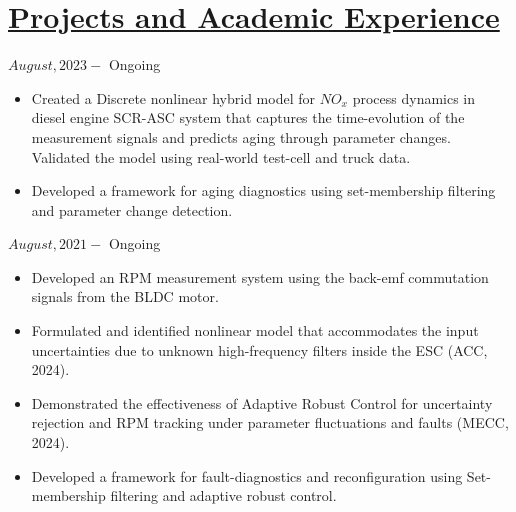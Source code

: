 \section*{\underline{Projects and Academic Experience}}
\noindent {} \hfill $August, 2023 - $ Ongoing
\begin{itemize}
        \item Created a Discrete nonlinear hybrid model for $NO_x$ process dynamics in diesel engine SCR-ASC system that captures the time-evolution of the measurement signals and predicts aging through parameter changes. Validated the model using real-world test-cell and truck data.
        \item Developed a framework for aging diagnostics using set-membership filtering and parameter change detection.
\end{itemize}

\medskip

\noindent {} \hfill $August, 2021 - $ Ongoing
\begin{itemize}
        \item Developed an RPM measurement system using the back-emf commutation signals from the BLDC motor.
        \item Formulated and identified nonlinear model that accommodates the input uncertainties due to unknown high-frequency filters inside the ESC (ACC, 2024).
        \item Demonstrated the effectiveness of Adaptive Robust Control for uncertainty rejection and RPM tracking under parameter fluctuations and faults (MECC, 2024).
        \item Developed a framework for fault-diagnostics and reconfiguration using Set-membership filtering and adaptive robust control.
\end{itemize}

\medskip

